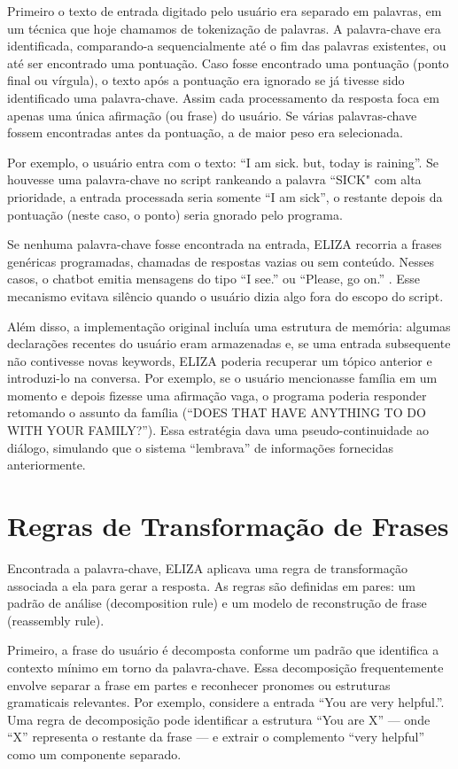 \documentclass[14pt,a4paper,oneside]{book}
\begin{document}
Primeiro o texto de entrada digitado pelo usuário era separado em palavras, em um técnica que hoje chamamos de tokenização de palavras. A palavra-chave era identificada, comparando-a sequencialmente até o fim das palavras existentes, ou até ser encontrado uma pontuação. Caso fosse encontrado uma pontuação (ponto final ou vírgula), o texto após a pontuação era ignorado se já tivesse sido identificado uma palavra-chave. Assim cada processamento da resposta foca em apenas uma única afirmação (ou frase) do usuário. Se várias palavras-chave fossem encontradas antes da pontuação, a de maior peso era selecionada.

Por exemplo, o usuário entra com o texto: “I am sick. but, today is raining”. Se houvesse uma palavra-chave no script rankeando a palavra “SICK" com alta prioridade, a entrada processada seria somente “I am sick”, o restante depois da pontuação (neste caso, o ponto) seria gnorado pelo programa.

Se nenhuma palavra-chave fosse encontrada na entrada, ELIZA recorria a frases genéricas programadas, chamadas de respostas vazias ou sem conteúdo. Nesses casos, o chatbot emitia mensagens do tipo “I see.” ou “Please, go on.” . Esse mecanismo evitava silêncio quando o usuário dizia algo fora do escopo do script.

Além disso, a implementação original incluía uma estrutura de memória: algumas declarações recentes do usuário eram armazenadas e, se uma entrada subsequente não contivesse novas keywords, ELIZA poderia recuperar um tópico anterior e introduzi-lo na conversa. Por exemplo, se o usuário mencionasse família em um momento e depois fizesse uma afirmação vaga, o programa poderia responder retomando o assunto da família (“DOES THAT HAVE ANYTHING TO DO WITH YOUR FAMILY?”). Essa estratégia dava uma pseudo-continuidade ao diálogo, simulando que o sistema “lembrava” de informações fornecidas anteriormente.

\section{Regras de Transformação de Frases}

Encontrada a palavra-chave, ELIZA aplicava uma regra de transformação associada a ela para gerar a resposta. As regras são definidas em pares: um padrão de análise (decomposition rule) e um modelo de reconstrução de frase (reassembly rule).

Primeiro, a frase do usuário é decomposta conforme um padrão que identifica a contexto mínimo em torno da palavra-chave. Essa decomposição frequentemente envolve separar a frase em partes e reconhecer pronomes ou estruturas gramaticais relevantes. Por exemplo, considere a entrada “You are very helpful.”. Uma regra de decomposição pode identificar a estrutura “You are X” — onde “X” representa o restante da frase — e extrair o complemento “very helpful” como um componente separado.
\end{document}
